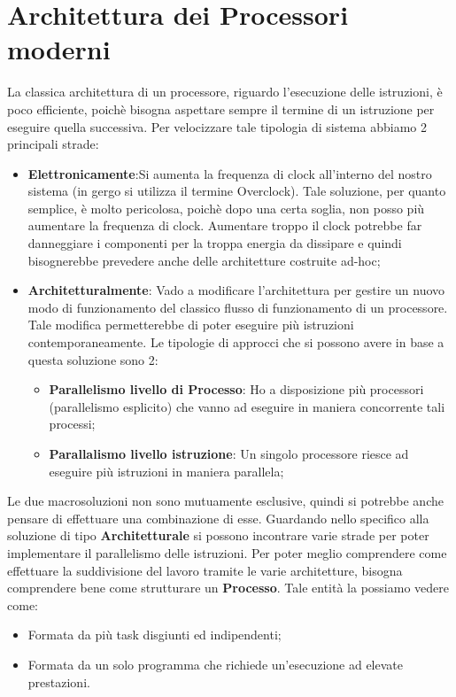 \newpage
\section{Architettura dei Processori moderni}
La classica architettura di un processore, riguardo l'esecuzione delle istruzioni, è poco efficiente, poichè bisogna aspettare sempre il termine di un istruzione per eseguire quella successiva.
Per velocizzare tale tipologia di sistema abbiamo 2 principali strade:
\begin{itemize}
    \item \textbf{Elettronicamente}:Si aumenta la frequenza di clock all'interno del nostro sistema (in gergo si utilizza il termine Overclock). Tale soluzione, per quanto semplice, è molto pericolosa, poichè dopo una certa soglia, non posso più aumentare la frequenza di clock. Aumentare troppo il clock potrebbe far danneggiare i componenti per la troppa energia da dissipare e quindi bisognerebbe prevedere anche delle architetture costruite ad-hoc;
    
    \item \textbf{Architetturalmente}: Vado a modificare l'architettura per gestire un nuovo modo di funzionamento del classico flusso di funzionamento di un processore. Tale modifica permetterebbe di poter eseguire più istruzioni contemporaneamente. Le tipologie di approcci che si possono avere in base a questa soluzione sono 2:
    \begin{itemize}
        \item \textbf{Parallelismo livello di Processo}: Ho a disposizione più processori (parallelismo esplicito) che vanno ad eseguire in maniera concorrente tali processi;
        \item \textbf{Parallalismo livello istruzione}: Un singolo processore riesce ad eseguire più istruzioni in maniera parallela;
    \end{itemize}
\end{itemize}

Le due macrosoluzioni non sono mutuamente esclusive, quindi si potrebbe anche pensare di effettuare una combinazione di esse.
Guardando nello specifico alla soluzione di tipo \textbf{Architetturale} si possono incontrare varie strade per poter implementare il parallelismo delle istruzioni.
Per poter meglio comprendere come effettuare la suddivisione del lavoro tramite le varie architetture, bisogna comprendere bene come strutturare un \textbf{Processo}. Tale entità la possiamo vedere come:
\begin{itemize}
    \item Formata da più task disgiunti ed indipendenti;
    \item Formata da un solo programma che richiede un'esecuzione ad elevate prestazioni.
\end{itemize}


